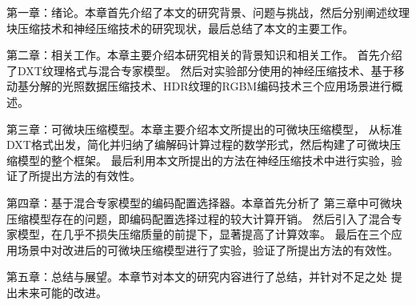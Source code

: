 第一章：绪论。本章首先介绍了本文的研究背景、问题与挑战，然后分别阐述纹理
块压缩技术和神经压缩技术的研究现状，最后总结了本文的主要工作。

第二章：相关工作。本章主要介绍本研究相关的背景知识和相关工作。
首先介绍了DXT纹理格式与混合专家模型。
然后对实验部分使用的神经压缩技术、基于移动基分解的光照数据压缩技术、HDR纹理的RGBM编码技术三个应用场景进行概述。

第三章：可微块压缩模型。本章主要介绍本文所提出的可微块压缩模型，
从标准DXT格式出发，简化并归纳了编解码计算过程的数学形式，然后构建了可微块压缩模型的整个框架。
最后利用本文所提出的方法在神经压缩技术中进行实验，验证了所提出方法的有效性。

第四章：基于混合专家模型的编码配置选择器。本章首先分析了
第三章中可微块压缩模型存在的问题，即编码配置选择过程的较大计算开销。
然后引入了混合专家模型，在几乎不损失压缩质量的前提下，显著提高了计算效率。
最后在三个应用场景中对改进后的可微块压缩模型进行了实验，验证了所提出方法的有效性。

第五章：总结与展望。本章节对本文的研究内容进行了总结，并针对不足之处
提出未来可能的改进。

